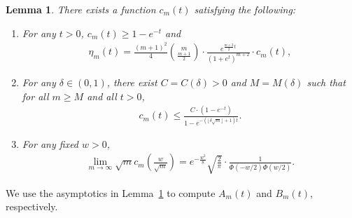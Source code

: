 \documentclass[11pt]{article}
\newcommand{\prn}[1]{\left({#1}\right)} %
\newcommand{\<}{\langle} %
\renewcommand{\>}{\rangle}
\newtheorem{lemma}[claim]{Lemma}
\begin{document}
\begin{lemma} \label{lem:rho-m-fisher-asymptotics}
  There exists a function $c_m(t)$ satisfying the following:
  \begin{enumerate}[leftmargin=*,label=(\roman*)]
  \item \label{item:eta-via-c}
    For any $t > 0$, $c_m(t) \geq 1 - e^{-t}$ and
    \begin{align*}
      \eta_m(t) = \frac{(m+1)^2}{4} \binom{m}{\frac{m+1}{2}} \cdot \frac{e^{\frac{m+3}{2}t}}{(1+e^t)^{m+2}} \cdot c_m(t),
    \end{align*}
  \item \label{item:c-m-by-delta} For any $\delta \in (0,1)$, there exist
    $C=C(\delta) > 0$ and $M=M(\delta)$ such that for all $m \geq M$
    and all $t > 0$,
    \begin{align*}
      c_m(t) \leq
      \frac{C \cdot(1 - e^{-t})}{1 - e^{-(\lfloor \delta \sqrt{m} \rfloor + 1) t}}.
    \end{align*}
  \item \label{item:normal-ratio-limit}
    For any fixed $w > 0$,
    \begin{align*}
      \lim_{m \to \infty} \sqrt{m} c_m \prn{\frac{w}{\sqrt{m}}}  = e^{-\frac{w^2}{8}} \sqrt{\frac{2}{\pi}} \cdot \frac{1}{\Phi(-w/2) \Phi(w/2)}.
    \end{align*}
  \end{enumerate}
\end{lemma}

We use the asymptotics in Lemma~\ref{lem:rho-m-fisher-asymptotics} to
compute $A_m(t)$ and $B_m(t)$, respectively.
\end{document}
